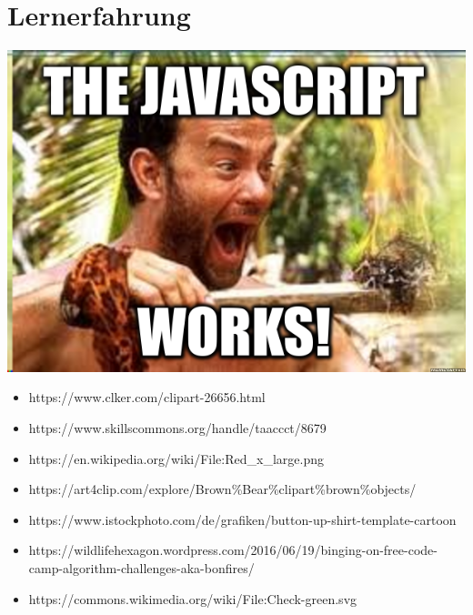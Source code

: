 \documentclass[xcolor=dvipsnames]{beamer}
\begin{document}
    \section{Lernerfahrung}
    \begin{frame}
        \begin{center}
             {\includegraphics[width=(\textwidth/2)]{img/javascript.png}}
        \end{center}
    \end{frame}

    \appendix
    \begin{frame}[plain]
        \begin{itemize}
            \item https://www.clker.com/clipart-26656.html \\
            \item https://www.skillscommons.org/handle/taaccct/8679 \\
            \item https://en.wikipedia.org/wiki/File:Red\_x\_large.png \\
            \item https://art4clip.com/explore/Brown\%Bear\%clipart\%brown\%objects/ \\
            \item https://www.istockphoto.com/de/grafiken/button-up-shirt-template-cartoon \\
            \item https://wildlifehexagon.wordpress.com/2016/06/19/binging-on-free-code-camp-algorithm-challenges-aka-bonfires/ \\
            \item https://commons.wikimedia.org/wiki/File:Check-green.svg \\
        \end{itemize}
    \end{frame}
\end{document}
